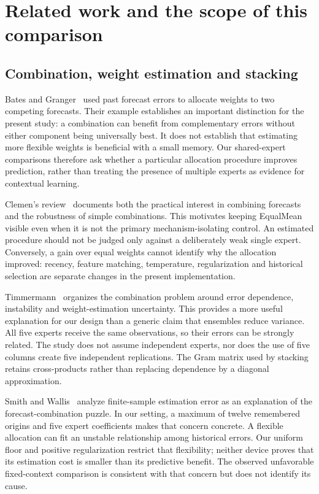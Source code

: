 \section{Related work and the scope of this comparison}
\label{sec:related-expanded}

\subsection{Combination, weight estimation and stacking}
Bates and Granger~\cite{bates} used past forecast errors to allocate weights to two competing forecasts. Their example establishes an important distinction for the present study: a combination can benefit from complementary errors without either component being universally best. It does not establish that estimating more flexible weights is beneficial with a small memory. Our shared-expert comparisons therefore ask whether a particular allocation procedure improves prediction, rather than treating the presence of multiple experts as evidence for contextual learning.

Clemen's review~\cite{clemen} documents both the practical interest in combining forecasts and the robustness of simple combinations. This motivates keeping EqualMean visible even when it is not the primary mechanism-isolating control. An estimated procedure should not be judged only against a deliberately weak single expert. Conversely, a gain over equal weights cannot identify why the allocation improved: recency, feature matching, temperature, regularization and historical selection are separate changes in the present implementation.

Timmermann~\cite{timmermann} organizes the combination problem around error dependence, instability and weight-estimation uncertainty. This provides a more useful explanation for our design than a generic claim that ensembles reduce variance. All five experts receive the same observations, so their errors can be strongly related. The study does not assume independent experts, nor does the use of five columns create five independent replications. The Gram matrix used by stacking retains cross-products rather than replacing dependence by a diagonal approximation.

Smith and Wallis~\cite{smithwallis} analyze finite-sample estimation error as an explanation of the forecast-combination puzzle. In our setting, a maximum of twelve remembered origins and five expert coefficients makes that concern concrete. A flexible allocation can fit an unstable relationship among historical errors. Our uniform floor and positive regularization restrict that flexibility; neither device proves that its estimation cost is smaller than its predictive benefit. The observed unfavorable fixed-context comparison is consistent with that concern but does not identify its cause.

